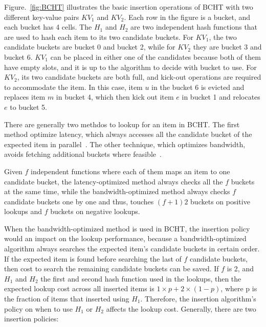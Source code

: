\documentclass[12pt,conference,compsoc]{IEEEtran}
\begin{document}
Figure.~\ref{fig:BCHT} illustrates the basic insertion operations of BCHT with two different key-value pairs $KV_1$ and $KV_2$. Each row in the figure is a bucket, and each bucket has 4 cells. The $H_1$ and $H_2$ are two independent hash functions that are used to hash each item to its two candidate buckets. For $KV_1$, the two candidate buckets are bucket 0 and bucket 2, while for $KV_2$ they are bucket 3 and bucket 6. $KV_1$ can be placed in either one of the candidates because both of them have empty slots, and it is up to the algorithm to decide with bucket to use. For $KV_2$, its two candidate buckets are both full, and kick-out operations are required to accommodate the item. In this case, item $u$ in the bucket 6 is evicted and replaces item $m$ in bucket 4, which then kick out item $e$ in bucket 1 and relocates $e$ to bucket 5. 

There are generally two methdos to lookup for an item in BCHT. The first method optimize latency, which always accesses all the candidate bucket of the expected item in parallel~\cite{li2014algorithmic}. The other technique, which optimizes bandwidth, avoids fetching additional buckets where feasible~\cite{memC3}.

Given $f$ independent functions where each of them maps an item to one candidate bucket, the latency-optimized method always checks all the $f$ buckets at the same time, while the bandwidth-optimized method always checks $f$ candidate buckets one by one and thus, touches $(f+1)2$ buckets on positive lookups and $f$ buckets on negative lookups.

When the bandwidth-optimized method is used in BCHT, the insertion policy would an impact on the lookup performance, because a bandwidth-optimized algorithm always searches the expected item's candidate buckets in certain order. If the expected item is found before searching the last of $f$ candidate buckets, then cost to search the remaining candidate buckets can be saved. If $f$ is 2, and $H_1$ and $H_2$ the first and second hash function used in the lookups, then the expected lookup cost across all inserted items is $1\times p+2\times (1-p)$, where p is the fraction of items that inserted using $H_1$. Therefore, the insertion algorithm's policy on when to use $H_1$ or $H_2$ affects the lookup cost. Generally, there are two insertion policies:
\end{document}
